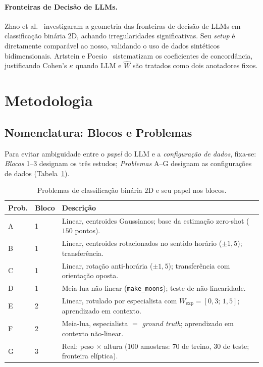 \documentclass[12pt,a4paper]{article}
\newcommand{\West}{\ensuremath{\hat{W}}}   %
\begin{document}
\paragraph{Fronteiras de Decisão de LLMs.}
Zhao et al.~\cite{zhaoProbing2024} investigaram a geometria das fronteiras de decisão de LLMs
em classificação binária $2$D, achando irregularidades significativas. Seu \emph{setup} é
diretamente comparável ao nosso, validando o uso de dados sintéticos bidimensionais.
Artstein e Poesio~\cite{artsteinInterCoder2008} sistematizam os coeficientes de concordância,
justificando Cohen's $\kappa$ quando LLM e \West{} são tratados como dois anotadores fixos.

\section{Metodologia}
\label{sec:metodologia}

\subsection{Nomenclatura: Blocos e Problemas}

Para evitar ambiguidade entre o \emph{papel} do LLM e a \emph{configuração de dados},
fixa-se: \emph{Blocos} 1–3 designam os três estudos; \emph{Problemas} A–G designam as
configurações de dados (Tabela~\ref{tab:problemas}).

\begin{table}[ht]
\centering
\caption{Problemas de classificação binária $2$D e seu papel nos blocos.}
\label{tab:problemas}
\small
\begin{tabular}{llp{7.8cm}}
\toprule
\textbf{Prob.} & \textbf{Bloco} & \textbf{Descrição} \\
\midrule
A & 1 & Linear, centroides Gaussianos; base da estimação zero-shot ($150$ pontos). \\
B & 1 & Linear, centroides rotacionados no sentido horário ($\pm 1{,}5$); transferência. \\
C & 1 & Linear, rotação anti-horária ($\pm 1{,}5$); transferência com orientação oposta. \\
D & 1 & Meia-lua não-linear (\texttt{make\_moons}); teste de não-linearidade. \\
E & 2 & Linear, rotulado por especialista com $W_{\text{exp}}=[0{,}3;\,1{,}5]$;
  aprendizado em contexto. \\
F & 2 & Meia-lua, especialista $=$ \emph{ground truth}; aprendizado em contexto
  não-linear. \\
G & 3 & Real: peso $\times$ altura ($100$ amostras: $70$ de treino, $30$ de teste;
  fronteira elíptica). \\
\bottomrule
\end{tabular}
\end{table}
\end{document}

